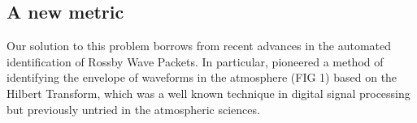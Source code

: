 \subsection{A new metric}

Our solution to this problem borrows from recent advances in the automated identification of Rossby Wave Packets. In particular, \citet{Zimin2003} pioneered a method of identifying the envelope of waveforms in the atmosphere (FIG 1) based on the Hilbert Transform, which was a well known technique in digital signal processing but previously untried in the atmospheric sciences.